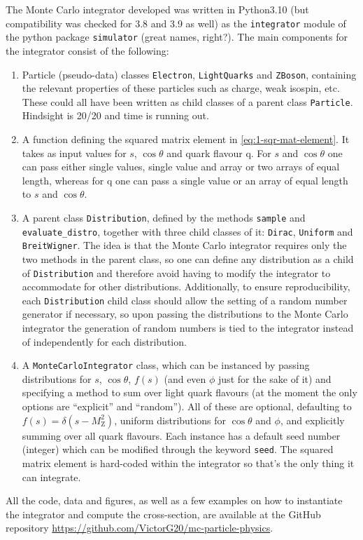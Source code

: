 The Monte Carlo integrator developed was written in Python3.10 (but compatibility was checked for 3.8 and 3.9 as well) as the \texttt{integrator} module of the python package \texttt{simulator} (great names, right?). The main components for the integrator consist of the following:
\begin{enumerate}
    \item Particle (pseudo-data) classes \texttt{Electron}, \texttt{LightQuarks} and \texttt{ZBoson}, containing the relevant properties of these particles such as charge, weak isospin, etc. These could all have been written as child classes of a parent class \texttt{Particle}. Hindsight is 20/20 and time is running out. 
    
    \item A function defining the squared matrix element in \eqref{eq:1-sqr-mat-element}. It takes as input values for $s$, $\cos{\theta}$ and quark flavour q. For $s$ and $\cos{\theta}$ one can pass either single values, single value and array or two arrays of equal length, whereas for q one can pass a single value or an array of equal length to $s$ and $\cos{\theta}$.

    \item A parent class \texttt{Distribution}, defined by the methods \texttt{sample} and \texttt{evaluate\_distro}, together with three child classes of it: \texttt{Dirac}, \texttt{Uniform} and \texttt{BreitWigner}. The idea is that the Monte Carlo integrator requires only the two methods in the parent class, so one can define any distribution as a child of \texttt{Distribution} and therefore avoid having to modify the integrator to accommodate for other distributions. Additionally, to ensure reproducibility, each \texttt{Distribution} child class should allow the setting of a random number generator if necessary, so upon passing the distributions to the Monte Carlo integrator the generation of random numbers is tied to the integrator instead of independently for each distribution.

    \item A \texttt{MonteCarloIntegrator} class, which can be instanced by passing distributions for $s$, $\cos{\theta}$, $f(s)$ (and even $\phi$ just for the sake of it) and specifying a method to sum over light quark flavours (at the moment the only options are “explicit” and “random”). All of these are optional, defaulting to $f(s) = \delta(s - M_{\mathrm{Z}}^{2})$, uniform distributions for $\cos{\theta}$ and $\phi$, and explicitly summing over all quark flavours. Each instance has a default seed number (integer) which can be modified through the keyword \texttt{seed}. The squared matrix element is hard-coded within the integrator so that's the only thing it can integrate.
    
\end{enumerate}
All the code, data and figures, as well as a few examples on how to instantiate the integrator and compute the cross-section, are available at the GitHub repository \url{https://github.com/VictorG20/mc-particle-physics}.

